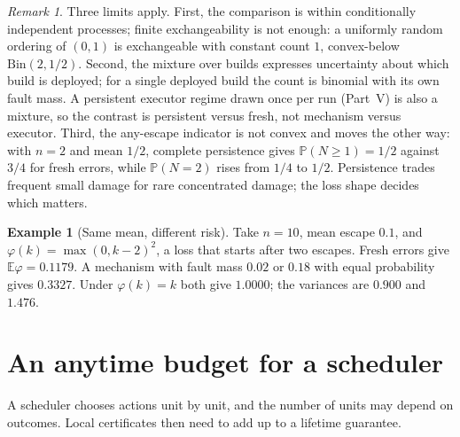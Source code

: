 \documentclass[11pt]{article}
\theoremstyle{definition}
\newtheorem{example}[theorem]{Example}
\theoremstyle{remark}
\newtheorem{remark}[theorem]{Remark}
\newcommand{\Prb}{\mathbb P}
\newcommand{\E}{\mathbb E}
\newcommand{\Bin}{\mathrm{Bin}}
\begin{document}
\begin{remark}
Three limits apply. First, the comparison is within conditionally independent processes; finite
exchangeability is not enough: a uniformly random ordering of $(0,1)$ is exchangeable with constant
count $1$, convex-below $\Bin(2,1/2)$. Second, the mixture over builds expresses uncertainty about
which build is deployed; for a single deployed build the count is binomial with its own fault mass.
A persistent executor regime drawn once per run (Part~V) is also a mixture, so the contrast is
persistent versus fresh, not mechanism versus executor. Third, the any-escape indicator is not
convex and moves the other way: with $n=2$ and mean $1/2$, complete persistence gives
$\Prb(N\ge1)=1/2$ against $3/4$ for fresh errors, while $\Prb(N=2)$ rises from $1/4$ to $1/2$.
Persistence trades frequent small damage for rare concentrated damage; the loss shape decides which
matters.
\end{remark}

\begin{example}[Same mean, different risk]\label{ex:spread}
Take $n=10$, mean escape $0.1$, and $\varphi(k)=\max(0,k-2)^2$, a loss that starts after two escapes.
Fresh errors give $\E\varphi=0.1179$. A mechanism with fault mass $0.02$ or $0.18$ with equal
probability gives $0.3327$. Under $\varphi(k)=k$ both give $1.0000$; the variances are $0.900$ and
$1.476$.
\end{example}

\section{An anytime budget for a scheduler}\label{sec:budget}
A scheduler chooses actions unit by unit, and the number of units may depend on outcomes. Local
certificates then need to add up to a lifetime guarantee.
\end{document}
